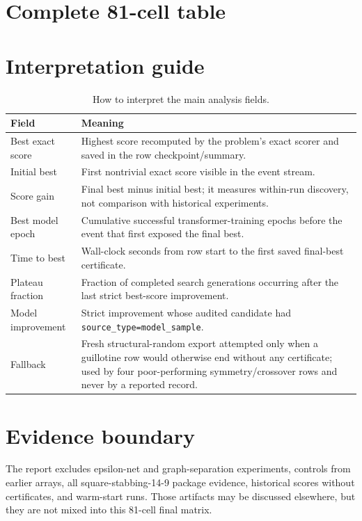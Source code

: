 \documentclass[11pt]{article}
\newcommand{\code}[1]{\texttt{#1}}
\begin{document}
\appendix
\clearpage
\section{Complete 81-cell table}



\clearpage
\section{Interpretation guide}

\begin{table}[H]
\centering
\caption{How to interpret the main analysis fields.}
\begin{tabularx}{\textwidth}{p{}X}
\toprule
Field & Meaning \\
\midrule
Best exact score & Highest score recomputed by the problem's exact scorer and
saved in the row checkpoint/summary. \\
Initial best & First nontrivial exact score visible in the event stream. \\
Score gain & Final best minus initial best; it measures within-run discovery,
not comparison with historical experiments. \\
Best model epoch & Cumulative successful transformer-training epochs before
the event that first exposed the final best. \\
Time to best & Wall-clock seconds from row start to the first saved final-best
certificate. \\
Plateau fraction & Fraction of completed search generations occurring after
the last strict best-score improvement. \\
Model improvement & Strict improvement whose audited candidate had
\code{source\_type=model\_sample}. \\
Fallback & Fresh structural-random export attempted only when a guillotine row
would otherwise end without any certificate; used by four poor-performing
symmetry/crossover rows and never by a reported record. \\
\bottomrule
\end{tabularx}
\end{table}

\section{Evidence boundary}

The report excludes epsilon-net and graph-separation experiments, controls
from earlier arrays, all square-stabbing-14-9 package evidence, historical
scores without certificates, and warm-start runs.  Those artifacts may be
discussed elsewhere, but they are not mixed into this 81-cell final matrix.
\end{document}

